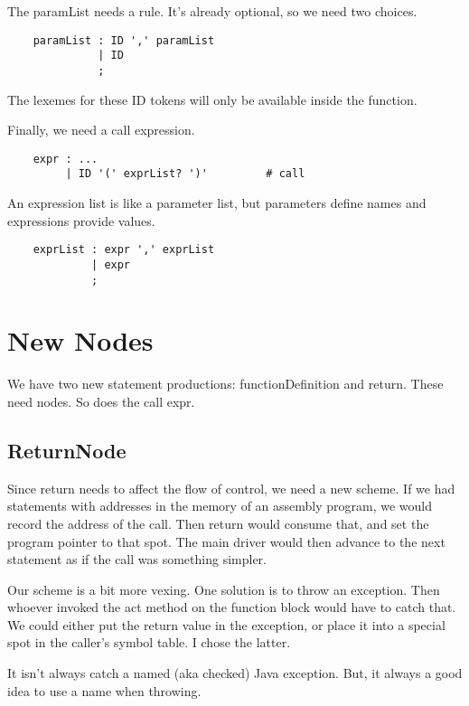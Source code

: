 The paramList needs a rule. It's already optional, so we need two
choices.

{\footnotesize
\begin{verbatim}
    paramList : ID ',' paramList
              | ID
              ;
\end{verbatim}
}

The lexemes for these ID tokens will only be available inside the function.

Finally, we need a call expression.

{\footnotesize
\begin{verbatim}
    expr : ...
         | ID '(' exprList? ')'         # call
\end{verbatim}
}

An expression list is like a parameter list, but parameters define
names and expressions provide values.

{\footnotesize
\begin{verbatim}
    exprList : expr ',' exprList
             | expr
             ;
\end{verbatim}
}

\section{New Nodes}

We have two new statement productions: functionDefinition and return.
These need nodes. So does the call expr.

\subsection{ReturnNode}

Since return needs to affect the flow of control, we need a new scheme.
If we had statements with addresses in the memory of an assembly program,
we would record the address of the call. Then return would consume that,
and set the program pointer to that spot. The main driver would then
advance to the next statement as if the call was something simpler.

Our scheme is a bit more vexing. One solution is to throw an exception.
Then whoever invoked the act method on the function block would have
to catch that. We could either put the return value in the exception,
or place it into a special spot in the caller's symbol table. I chose
the latter.

It isn't always catch a named (aka checked) Java exception.
But, it always a good idea to use a name when throwing.

